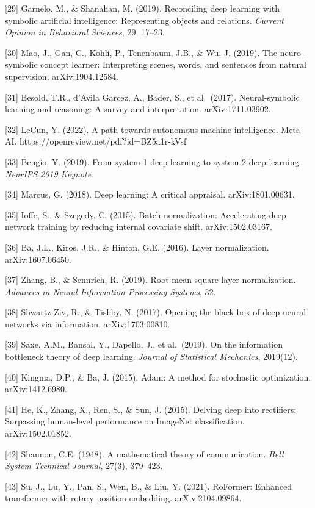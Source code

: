 \documentclass[
  11pt,
  letterpaper,
]{article}
\begin{document}
{[}29{]} Garnelo, M., \& Shanahan, M. (2019). Reconciling deep learning
with symbolic artificial intelligence: Representing objects and
relations. \emph{Current Opinion in Behavioral Sciences}, 29, 17--23.

{[}30{]} Mao, J., Gan, C., Kohli, P., Tenenbaum, J.B., \& Wu, J. (2019).
The neuro-symbolic concept learner: Interpreting scenes, words, and
sentences from natural supervision. arXiv:1904.12584.

{[}31{]} Besold, T.R., d'Avila Garcez, A., Bader, S., et al.~(2017).
Neural-symbolic learning and reasoning: A survey and interpretation.
arXiv:1711.03902.

{[}32{]} LeCun, Y. (2022). A path towards autonomous machine
intelligence. Meta AI. https://openreview.net/pdf?id=BZ5a1r-kVsf

{[}33{]} Bengio, Y. (2019). From system 1 deep learning to system 2 deep
learning. \emph{NeurIPS 2019 Keynote}.

{[}34{]} Marcus, G. (2018). Deep learning: A critical appraisal.
arXiv:1801.00631.

{[}35{]} Ioffe, S., \& Szegedy, C. (2015). Batch normalization:
Accelerating deep network training by reducing internal covariate shift.
arXiv:1502.03167.

{[}36{]} Ba, J.L., Kiros, J.R., \& Hinton, G.E. (2016). Layer
normalization. arXiv:1607.06450.

{[}37{]} Zhang, B., \& Sennrich, R. (2019). Root mean square layer
normalization. \emph{Advances in Neural Information Processing Systems},
32.

{[}38{]} Shwartz-Ziv, R., \& Tishby, N. (2017). Opening the black box of
deep neural networks via information. arXiv:1703.00810.

{[}39{]} Saxe, A.M., Bansal, Y., Dapello, J., et al.~(2019). On the
information bottleneck theory of deep learning. \emph{Journal of
Statistical Mechanics}, 2019(12).

{[}40{]} Kingma, D.P., \& Ba, J. (2015). Adam: A method for stochastic
optimization. arXiv:1412.6980.

{[}41{]} He, K., Zhang, X., Ren, S., \& Sun, J. (2015). Delving deep
into rectifiers: Surpassing human-level performance on ImageNet
classification. arXiv:1502.01852.

{[}42{]} Shannon, C.E. (1948). A mathematical theory of communication.
\emph{Bell System Technical Journal}, 27(3), 379--423.

{[}43{]} Su, J., Lu, Y., Pan, S., Wen, B., \& Liu, Y. (2021). RoFormer:
Enhanced transformer with rotary position embedding. arXiv:2104.09864.
\end{document}
